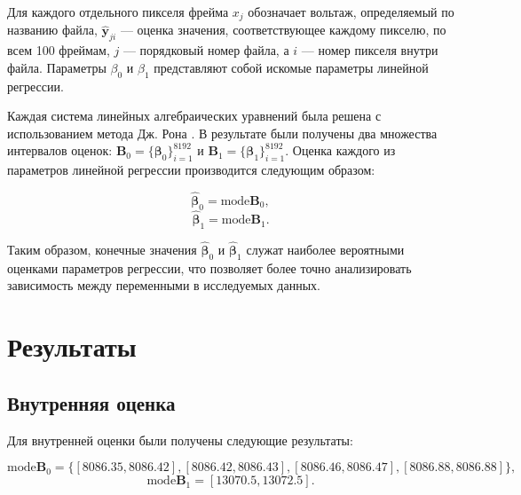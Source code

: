 \documentclass{article}
\begin{document}
  Для каждого отдельного пикселя фрейма \( x_j \) обозначает вольтаж,
  определяемый по названию файла, \( \hat{\mathbf{y}}_{ji} \) --- оценка
  значения, соответствующее каждому пикселю, по всем 100 фреймам,
  \( j \) --- порядковый номер файла, а \( i \) --- номер пикселя внутри
  файла. Параметры \( \beta_0 \) и \( \beta_1 \) представляют собой искомые
  параметры линейной регрессии.

  Каждая система линейных алгебраических уравнений была решена с
  использованием метода Дж. Рона \cite{rohn}. В результате были получены
  два множества интервалов оценок:
  \( \mathbf{B}_0 = \{ \mathbf{\beta}_0 \}_{i=1}^{8192} \)
  и \( \mathbf{B}_1 = \{ \mathbf{\beta}_1 \}_{i=1}^{8192} \). Оценка каждого
  из параметров линейной регрессии производится следующим образом:

  \[ \hat{\mathbf{\beta}}_0 = \text{mode} \mathbf{B}_0, \]
  \[ \hat{\mathbf{\beta}}_1 = \text{mode} \mathbf{B}_1. \]

  Таким образом, конечные значения \( \hat{\mathbf{\beta}}_0 \) и
  \( \hat{\mathbf{\beta}}_1 \) служат наиболее вероятными оценками
  параметров регрессии, что позволяет более точно анализировать
  зависимость между переменными в исследуемых данных.

  \section{Результаты}

  \subsection{Внутренняя оценка}

  Для внутренней оценки были получены следующие результаты:

  \[
    \text{mode} \mathbf{B}_0
      = \{ [8086.35, 8086.42], [8086.42, 8086.43], [8086.46, 8086.47], [8086.88, 8086.88] \},
  \]
  \[
    \text{mode} \mathbf{B}_1 = [13070.5, 13072.5].
  \]
\end{document}
